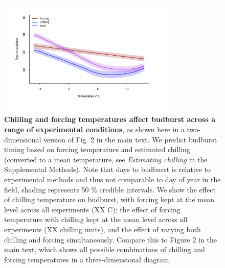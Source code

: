 \documentclass{article}
\begin{document}
\begin{figure}[h!]
\centering
\noindent \includegraphics[width=0.75\textwidth]{..//..//analyses/bb_analysis/figures/mupredictschill_utah_pep.pdf}
\caption{\textbf{Chilling and forcing temperatures affect budburst across a range of experimental conditions}, as shown here in a two-dimensional version of Fig. 2 in the main text. We predict budburst timing based on forcing temperature and estimated chilling (converted to a mean temperature, see \emph{Estimating chilling} in the Supplemental Methods). Note that days to budburst is relative to experimental methods and thus not comparable to day of year in the field, shading represents 50 \% credible intervals. We show the effect of chilling temperature on budburst, with forcing kept at the mean level across all experiments (XX \degree C);  the effect of forcing temperature with chilling kept at the mean level across all experiments (XX chilling units), and  the effect of varying both chilling and forcing simultaneously.  Compare  this to Figure 2 in the main text, which shows all possible combinations of chilling and forcing temperatures in a three-dimensional diagram.}
\label{fig:fagsyllat}
\end{figure}
\end{document}
